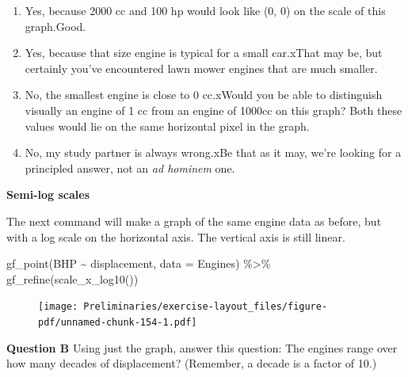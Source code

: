 \documentclass[
  letterpaper,
  DIV=11,
  numbers=noendperiod,
  oneside]{article}
\newenvironment{Shaded}{\begin{snugshade}}{\end{snugshade}}
\newcommand{\AttributeTok}[1]{\textcolor[rgb]{0.40,0.45,0.13}{#1}}
\newcommand{\FunctionTok}[1]{\textcolor[rgb]{0.28,0.35,0.67}{#1}}
\newcommand{\NormalTok}[1]{\textcolor[rgb]{0.00,0.23,0.31}{#1}}
\newcommand{\SpecialCharTok}[1]{\textcolor[rgb]{0.37,0.37,0.37}{#1}}
\providecommand{\tightlist}{%
  \setlength{\itemsep}{0pt}\setlength{\parskip}{0pt}}\usepackage{longtable,booktabs,array}
\begin{document}
\begin{multicols}{2}
\begin{enumerate}
\def\labelenumi{\roman{enumi}.}
\tightlist
\item
  {Yes, because 2000 cc and 100 hp would look like (0, 0) on the scale
  of this graph.{Good.~}}\\
\item
  {Yes, because that size engine is typical for a small car.{xThat may
  be, but certainly you've encountered lawn mower engines that are much
  smaller.}}\\
\item
  {No, the smallest engine is close to 0 cc.{xWould you be able to
  distinguish visually an engine of 1 cc from an engine of 1000cc on
  this graph? Both these values would lie on the same horizontal pixel
  in the graph.}}\\
\item
  {No, my study partner is always wrong.{xBe that as it may, we're
  looking for a principled answer, not an \emph{ad hominem} one.}}
\end{enumerate}

\textbf{Semi-log scales}

The next command will make a graph of the same engine data as before,
but with a log scale on the horizontal axis. The vertical axis is still
linear.

\begin{Shaded}
\begin{Highlighting}[]
\FunctionTok{gf\_point}\NormalTok{(BHP }\SpecialCharTok{\textasciitilde{}}\NormalTok{ displacement, }\AttributeTok{data =}\NormalTok{ Engines) }\SpecialCharTok{\%\textgreater{}\%}
  \FunctionTok{gf\_refine}\NormalTok{(}\FunctionTok{scale\_x\_log10}\NormalTok{())}
\end{Highlighting}
\end{Shaded}

\begin{figure}[H]

{\centering \texttt{[image: Preliminaries/exercise-layout\_files/figure-pdf/unnamed-chunk-154-1.pdf]}

}

\end{figure}

\textbf{Question B} Using just the graph, answer this question: The
engines range over how many decades of displacement? (Remember, a decade
is a factor of 10.)


\end{multicols}
\end{document}

